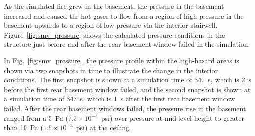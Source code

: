 \documentclass[12pt,oneside]{book}
\begin{document}
As the simulated fire grew in the basement, the pressure in the basement increased and caused the hot gases to flow from a region of high pressure in the basement upwards to a region of low pressure via the interior stairwell. Figure~\ref{fig:smv_pressure} shows the calculated pressure conditions in the structure just before and after the rear basement window failed in the simulation.

In Fig.~\ref{fig:smv_pressure}, the pressure profile within the high-hazard areas is shown via two snapshots in time to illustrate the change in the interior conditions. The first snapshot is shown at a simulation time of 340~s, which is 2~s before the first rear basement window failed, and the second snapshot is shown at a simulation time of 343~s, which is 1~s after the first rear basement window failed. After the rear basement windows failed, the pressure rise in the basement ranged from a 5~Pa ($7.3 \times 10^{-4}$~psi) over-pressure at mid-level height to greater than 10~Pa ($1.5 \times 10^{-3}$~psi) at the ceiling.
\end{document}
